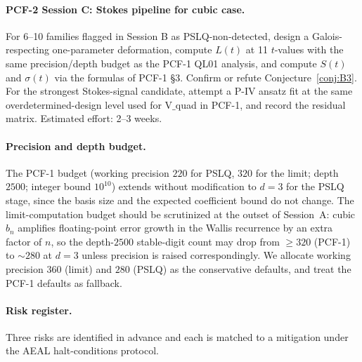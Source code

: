 \documentclass[11pt,a4paper]{article}
\theoremstyle{definition}
\theoremstyle{remark}
\begin{document}
\paragraph{PCF-2 Session C: Stokes pipeline for cubic case.}
For 6--10 families flagged in Session B as PSLQ-non-detected, design a
Galois-respecting one-parameter deformation, compute $L(t)$ at 11
$t$-values with the same precision/depth budget as the PCF-1 QL01
analysis, and compute $S(t)$ and $\sigma(t)$ via the formulas of PCF-1
\S 3. Confirm or refute Conjecture~\ref{conj:B3}. For the
strongest Stokes-signal candidate, attempt a P-IV ansatz fit at the
same overdetermined-design level used for V$\_$quad in PCF-1, and
record the residual matrix. Estimated effort: 2--3 weeks.

\paragraph{Precision and depth budget.}
The PCF-1 budget (working precision $220$ for PSLQ, $320$ for the
limit; depth $2500$; integer bound $10^{10}$) extends without
modification to $d=3$ for the PSLQ stage, since the basis size and the
expected coefficient bound do not change. The limit-computation budget
should be scrutinized at the outset of Session~A: cubic $b_{n}$
amplifies floating-point error growth in the Wallis recurrence by an
extra factor of $n$, so the depth-$2500$ stable-digit count may drop
from $\ge 320$ (PCF-1) to $\sim 280$ at $d=3$ unless precision is
raised correspondingly. We allocate working precision $360$ (limit) and
$280$ (PSLQ) as the conservative defaults, and treat the PCF-1
defaults as fallback.

\paragraph{Risk register.}
Three risks are identified in advance and each is matched to a
mitigation under the AEAL halt-conditions protocol.
\end{document}
